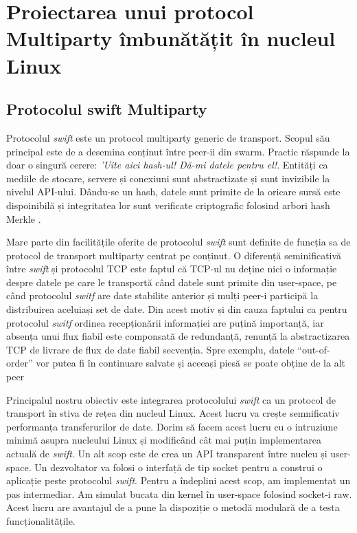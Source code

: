 
\chapter{Proiectarea unui protocol Multiparty îmbunătățit în nucleul Linux}
\label{chapter:multiparty}

\section{Protocolul swift Multiparty}
\label{sec:multiparty:swift}

Protocolul \textit{swift} este un protocol multiparty generic de transport.
Scopul său principal este de a desemina conținut între peer-ii din swarm.
Practic răspunde la doar o singură cerere: \textit{'Uite aici hash-ul!
Dă-mi datele pentru el!}. Entități ca mediile de stocare, servere și
conexiuni sunt abstractizate și sunt invizibile la nivelul API-ului.
Dându-se un hash, datele sunt primite de la oricare sursă este dispoinibilă
și integritatea lor sunt verificate criptografic folosind arbori hash
Merkle \cite{merkle}.

Mare parte din facilitățile oferite de protocolul \textit{swift} sunt
definite de funcția sa de protocol de transport multiparty centrat pe
conținut. O diferență seminificativă între \textit{swift} și protocolul TCP
este faptul că TCP-ul nu deține nici o informație despre datele pe care le
transportă când datele sunt primite din user-space, pe când protocolul
\textit{switf} are date stabilite anterior și mulți peer-i participă la
distribuirea aceluiași set de date. Din acest motiv și din cauza faptului
ca pentru protocolul \textit{switf} ordinea recepționării informației are
puțină importanță, iar absența unui flux fiabil este componsată de redundanță,
renunță la abstractizarea TCP de livrare de flux de date fiabil secvenția.
Spre exemplu, datele ``out-of-order'' vor putea fi în continuare salvate și
aceeași piesă se poate obține de la alt peer

Principalul nostru obiectiv este integrarea protocolului \textit{swift} ca
un protocol de transport în stiva de rețea din nucleul Linux. Acest lucru
va crește semnificativ performanța transferurilor de date. Dorim să facem
acest lucru cu o intruziune minimă asupra nucleului Linux și modificând cât
mai puțin implementarea actuală de \textit{swift}. Un alt scop este de crea
un API transparent între nucleu și user-space. Un dezvoltator va folosi o
interfață de tip socket pentru a construi o aplicație peste protocolul
\textit{swift}. Pentru a îndeplini acest scop, am implementat un pas
intermediar. Am simulat bucata din kernel în user-space folosind socket-i
raw. Acest lucru are avantajul de a pune la dispoziție o metodă modulară de
a testa funcționalitățile.

